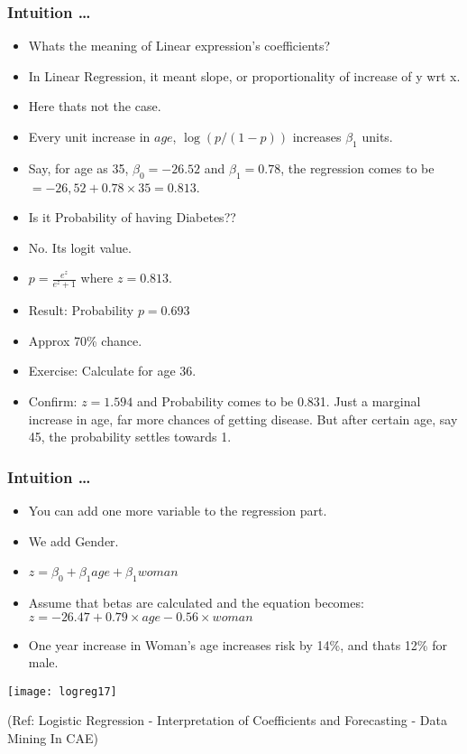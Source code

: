 \begin{frame}[fragile]\frametitle{Intuition \ldots}
 \begin{itemize}
\item Whats the meaning of Linear expression's coefficients?
\item In Linear Regression, it meant slope, or proportionality of increase of y wrt x.
\item Here thats not the case.
\item Every unit increase in $age$, $\log(p/(1-p))$ increases $\beta_1$ units.
\item Say, for age as 35, $\beta_0 = -26.52$ and $\beta_1 = 0.78$, the regression comes to be $ = -26,52 + 0.78 \times 35 = 0.813$.
\item Is it Probability of having Diabetes??
\item No. Its logit value.
\item $p = \frac{e^z}{e^z + 1}$ where $z = 0.813$. 
\item Result: Probability $p = 0.693$
\item Approx 70\% chance.
\item Exercise: Calculate for age 36.
\item Confirm: $z = 1.594$ and Probability comes to be 0.831. Just a marginal increase in age, far more chances of getting disease. But after certain age, say 45, the probability settles towards 1.
\end{itemize}
\end{frame}

\begin{frame}[fragile]\frametitle{Intuition \ldots}
 \begin{itemize}
\item You can add one more variable to the regression part.
\item We add Gender.
\item $z = \beta_0 + \beta_1 age + \beta_1 woman$
\item Assume that betas are calculated and the equation becomes: $z = -26.47 + 0.79 \times age -0.56 \times woman$
\item One year increase in Woman's age increases risk by 14\%, and thats 12\% for male.
\end{itemize}

\begin{center}
\texttt{[image: logreg17]}
\end{center}

{\tiny (Ref: Logistic Regression - Interpretation of Coefficients and Forecasting - Data Mining In CAE)}
\end{frame}



